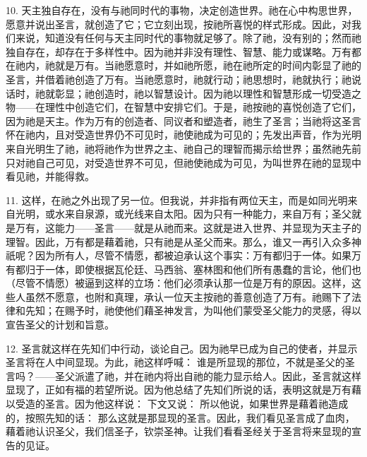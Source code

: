 10. 天主独自存在，没有与祂同时代的事物，决定创造世界。祂在心中构思世界，愿意并说出圣言，就创造了它；它立刻出现，按祂所喜悦的样式形成。因此，对我们来说，知道没有任何与天主同时代的事物就足够了。除了祂，没有别的；然而祂独自存在，却存在于多样性中。因为祂并非没有理性、智慧、能力或谋略。万有都在祂内，祂就是万有。当祂愿意时，并如祂所愿，祂在祂所定的时间内彰显了祂的圣言，并借着祂创造了万有。当祂愿意时，祂就行动；祂思想时，祂就执行；祂说话时，祂就彰显；祂创造时，祂以智慧设计。因为祂以理性和智慧形成一切受造之物——在理性中创造它们，在智慧中安排它们。于是，祂按祂的喜悦创造了它们，因为祂是天主。作为万有的创造者、同议者和塑造者，祂生了圣言；当祂将这圣言怀在祂内，且对受造世界仍不可见时，祂使祂成为可见的；先发出声音，作为光明来自光明生了祂，祂将祂作为世界之主、祂自己的理智而揭示给世界；虽然祂先前只对祂自己可见，对受造世界不可见，但祂使祂成为可见，为叫世界在祂的显现中看见祂，并能得救。\par

11. 这样，在祂之外出现了另一位。但我说，并非指有两位天主，而是如同光明来自光明，或水来自泉源，或光线来自太阳。因为只有一种能力，来自万有；圣父就是万有，这能力——圣言——就是从祂而来。这就是进入世界、并显现为天主子的理智。因此，万有都是藉着祂，只有祂是从圣父而来。那么，谁又一再引入众多神祇呢？因为所有人，尽管不情愿，都被迫承认这个事实：万有都归于一体。如果万有都归于一体，即使根据瓦伦廷、马西翁、塞林图和他们所有愚蠢的言论，他们也（尽管不情愿）被逼到这样的立场：他们必须承认那一位是万有的原因。这样，这些人虽然不愿意，也附和真理，承认一位天主按祂的善意创造了万有。祂赐下了法律和先知；在赐予时，祂使他们藉圣神发言，为叫他们蒙受圣父能力的灵感，得以宣告圣父的计划和旨意。\par

12. 圣言就这样在先知们中行动，谈论自己。因为祂早已成为自己的使者，并显示圣言将在人中间显现。为此，祂这样呼喊： 谁是所显现的那位，不就是圣父的圣言吗？——圣父派遣了祂，并在祂内将出自祂的能力显示给人。因此，圣言就这样显现了，正如有福的若望所说。因为他总结了先知们所说的话，表明这就是万有藉以受造的圣言。因为他这样说： 下文又说： 所以他说，如果世界是藉着祂造成的，按照先知的话： 那么这就是那显现的圣言。因此，我们看见圣言成了血肉，藉着祂认识圣父，我们信圣子，钦崇圣神。让我们看看圣经关于圣言将来显现的宣告的见证。\par

